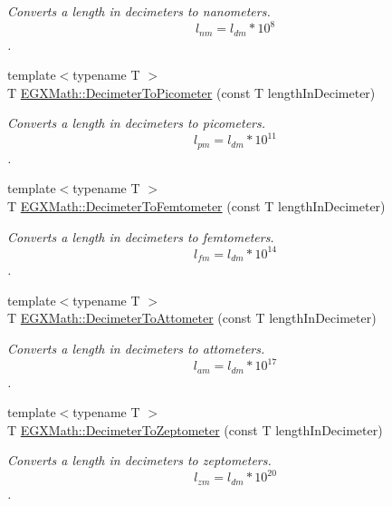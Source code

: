 \begin{DoxyCompactItemize}
\begin{DoxyCompactList}\small\item\em Converts a length in decimeters to nanometers. \[ l_{nm}=l_{dm} * 10^{8} \]. \end{DoxyCompactList}\item 
{\footnotesize template$<$typename T $>$ }\\T \mbox{\hyperlink{group___e_g_x_math-_conversions-_length_conversions-_s_i-_decimeter-_s_i_gaac5fa4b7b538abe2d19f33e131e9bbde}{E\+G\+X\+Math\+::\+Decimeter\+To\+Picometer}} (const T length\+In\+Decimeter)
\begin{DoxyCompactList}\small\item\em Converts a length in decimeters to picometers. \[ l_{pm}=l_{dm} * 10^{11} \]. \end{DoxyCompactList}\item 
{\footnotesize template$<$typename T $>$ }\\T \mbox{\hyperlink{group___e_g_x_math-_conversions-_length_conversions-_s_i-_decimeter-_s_i_gab06170fbc8b349582e4ae34d41f3f706}{E\+G\+X\+Math\+::\+Decimeter\+To\+Femtometer}} (const T length\+In\+Decimeter)
\begin{DoxyCompactList}\small\item\em Converts a length in decimeters to femtometers. \[ l_{fm}=l_{dm} * 10^{14} \]. \end{DoxyCompactList}\item 
{\footnotesize template$<$typename T $>$ }\\T \mbox{\hyperlink{group___e_g_x_math-_conversions-_length_conversions-_s_i-_decimeter-_s_i_ga9b13c4c4f05e01a1e28293b26b69e01a}{E\+G\+X\+Math\+::\+Decimeter\+To\+Attometer}} (const T length\+In\+Decimeter)
\begin{DoxyCompactList}\small\item\em Converts a length in decimeters to attometers. \[ l_{am}=l_{dm} * 10^{17} \]. \end{DoxyCompactList}\item 
{\footnotesize template$<$typename T $>$ }\\T \mbox{\hyperlink{group___e_g_x_math-_conversions-_length_conversions-_s_i-_decimeter-_s_i_ga5462e9c56431f0cf1daeafb729eeed24}{E\+G\+X\+Math\+::\+Decimeter\+To\+Zeptometer}} (const T length\+In\+Decimeter)
\begin{DoxyCompactList}\small\item\em Converts a length in decimeters to zeptometers. \[ l_{zm}=l_{dm} * 10^{20} \]. \end{DoxyCompactList}\item 

\end{DoxyCompactItemize}
